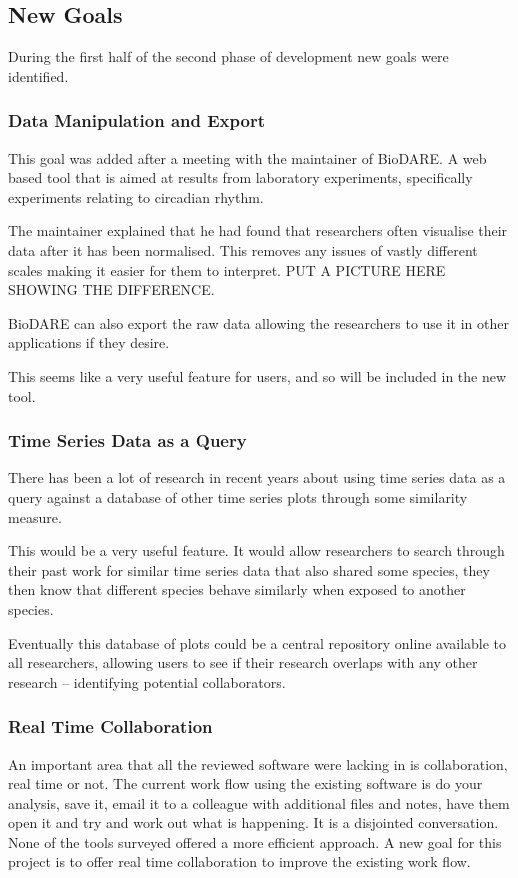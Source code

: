\subsection{New Goals}
During the first half of the second phase of development new goals were identified.

\subsubsection{Data Manipulation and Export}

This goal was added after a meeting with the maintainer of BioDARE.  A web based tool that is aimed at results from laboratory experiments, specifically experiments relating to circadian rhythm.

The maintainer explained that he had found that researchers often visualise their data after it has been normalised.  This removes any issues of vastly different scales making it easier for them to interpret. PUT A PICTURE HERE SHOWING THE DIFFERENCE.

BioDARE can also export the raw data allowing the researchers to use it in other applications if they desire.

This seems like a very useful feature for users, and so will be included in the new tool.

\subsubsection{Time Series Data as a Query}

There has been a lot of research in recent years about using time series data as a query against a database of other time series plots through some similarity measure.

This would be a very useful feature.  It would allow researchers to search through their past work for similar time series data that also shared some species, they then know that different species behave similarly when exposed to another species.

Eventually this database of plots could be a central repository online available to all researchers, allowing users to see if their research overlaps with any other research -- identifying potential collaborators.

\subsubsection{Real Time Collaboration}

An important area that all the reviewed software were lacking in is collaboration, real time or not.  The current work flow using the existing software is do your analysis, save it, email it to a colleague with additional files and notes, have them open it and try and work out what is happening.  It is a disjointed conversation.  None of the tools surveyed offered a more efficient approach.  A new goal for this project is to offer real time collaboration to improve the existing work flow.
